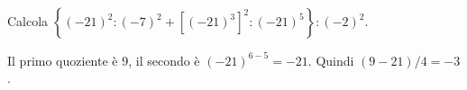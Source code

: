 
\begin{esercizio}
Calcola $\left\{(-21)^2:(-7)^2+\left[(-21)^3\right]^2:(-21)^5\right\}:(-2)^2$.
\end{esercizio}

\begin{soluzione}
Il primo quoziente è 9, il secondo è $(-21)^{6-5}=-21$. Quindi $(9-21)/4=-3$.
\end{soluzione}
